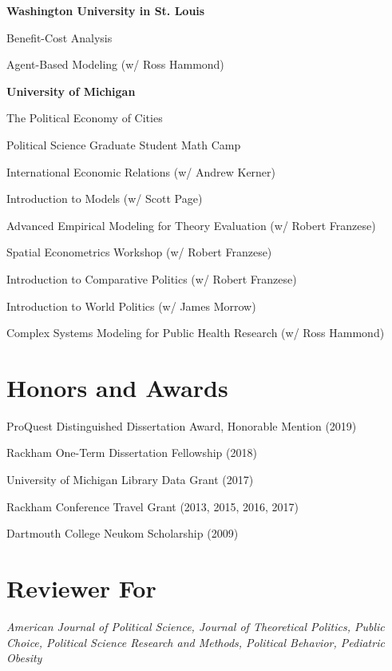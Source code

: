 \documentclass[margin,line]{res}
\newenvironment{list1}{
  \begin{list}{}{%
      \setlength{\itemsep}{0.1in}
      \setlength{\parsep}{0in} \setlength{\parskip}{0in}
      \setlength{\topsep}{0.1in} \setlength{\partopsep}{0in} 
      \setlength{\leftmargin}{0.17in}}}{\end{list}}
\begin{document}
\begin{resume}
\textbf{Washington University in St. Louis}
\begin{list1}
	\item[] Benefit-Cost Analysis
	\item[] Agent-Based Modeling (w/ Ross Hammond)
\end{list1}

\textbf{University of Michigan}
\begin{list1}
	\item[] The Political Economy of Cities
	\item[] Political Science Graduate Student Math Camp
	\item International Economic Relations (w/ Andrew Kerner)
	\item Introduction to Models (w/ Scott Page)
	\item Advanced Empirical Modeling for Theory Evaluation (w/ Robert Franzese)
	\item Spatial Econometrics Workshop (w/ Robert Franzese)
	\item Introduction to Comparative Politics (w/ Robert Franzese)
	\item Introduction to World Politics (w/ James Morrow)
	\item Complex Systems Modeling for Public Health Research (w/ Ross Hammond)
\end{list1}



\section{\sc Honors and Awards} 

ProQuest Distinguished Dissertation Award, Honorable Mention (2019)

Rackham One-Term Dissertation Fellowship (2018)

University of Michigan Library Data Grant (2017)

Rackham Conference Travel Grant (2013, 2015, 2016, 2017)

Dartmouth College Neukom Scholarship (2009)



\section{\sc Reviewer For}
\textit{American Journal of Political Science, Journal of Theoretical Politics, Public Choice, Political Science Research and Methods, Political Behavior, Pediatric Obesity}


\end{resume}
\end{document}
